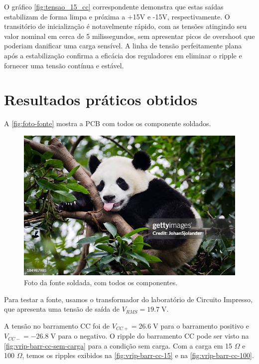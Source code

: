 \documentclass[
	12pt,				%
	oneside,			%
	a4paper,			%
	chapter=TITLE,
	sumario=tradicional,
	english,			%
	brazil				%
]{abntex2}
\newcommand{\un}[1]{\;\text{#1}}
\begin{document}
O gráfico \ref{fig:tensao_15_cc} correspondente demonstra que estas saídas estabilizam de forma limpa e próxima a +15V e -15V, respectivamente. O transitório de inicialização é notavelmente rápido, com as tensões atingindo seu valor nominal em cerca de 5 milissegundos, sem apresentar picos de overshoot que poderiam danificar uma carga sensível. A linha de tensão perfeitamente plana após a estabilização confirma a eficácia dos reguladores em eliminar o ripple e fornecer uma tensão contínua e estável.

\chapter{Resultados práticos obtidos}\label{cap:resultados} 

A \autoref{fig:foto-fonte} mostra a PCB com todos os componente soldados.

\begin{figure}[H]
    \centering
    \includegraphics[width=0.9\linewidth]{images/resultados/random-panda.jpg}
    \caption{Foto da fonte soldada, com todos os componentes.}
    \label{fig:foto-fonte}
\end{figure}

Para testar a fonte, usamos o transformador do laboratório de Circuito Impresso, que apresenta 
uma tensão de saída de $V_{RMS} = 19.7 \un{V}$.

A tensão no barramento CC foi de $V_{CC+} = 26.6 \un{V}$ para o barramento positivo 
e $V_{CC-} = - 26.8 \un{V}$ para o negativo. O ripple do barramento CC pode ser 
visto na \autoref{fig:vrip-barr-cc-sem-carga} para a condição sem carga.
Com a carga em 15 $\Omega$ e 100 $\Omega$, temos os ripples exibidos 
na \autoref{fig:vrip-barr-cc-15} e na \autoref{fig:vrip-barr-cc-100}.
\end{document}
